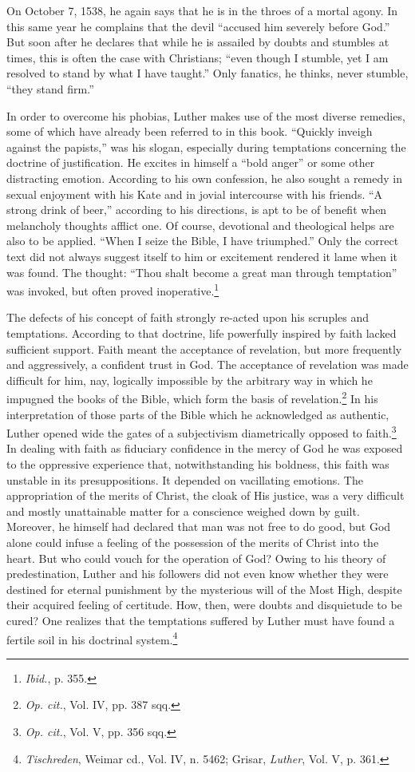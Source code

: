 On October 7, 1538, he again says that he is in the throes of a
mortal agony. In this same year he complains that the devil “accused
him severely before God.” But soon after he declares that while he is
assailed by doubts and stumbles at times, this is often the case with
Christians; “even though I stumble, yet I am resolved to stand by
what I have taught.” Only fanatics, he thinks, never stumble, “they
stand firm.”

In order to overcome his phobias, Luther makes use of the most
diverse remedies, some of which have already been referred to in
this book. “Quickly inveigh against the papists,” was his slogan,
especially during temptations concerning the doctrine of justification.
He excites in himself a “bold anger” or some other distracting
emotion. According to his own confession, he also sought a remedy in
sexual enjoyment with his Kate and in jovial intercourse with his
friends. “A strong drink of beer,” according to his directions, is apt
to be of benefit when melancholy thoughts afflict one. Of course,
devotional and theological helps are also to be applied. “When I seize
the Bible, I have triumphed.” Only the correct text did not always
suggest itself to him or excitement rendered it lame when it was
found. The thought: “Thou shalt become a great man through temptation”
was invoked, but often proved inoperative.\footnote{\textit{Ibid.}, p. 355.}

The defects of his concept of faith strongly re-acted upon his
scruples and temptations. According to that doctrine, life powerfully
inspired by faith lacked sufficient support. Faith meant the acceptance
of revelation, but more frequently and aggressively, a confident trust
in God. The acceptance of revelation was made difficult for him, nay,
logically impossible by the arbitrary way in which he impugned the
books of the Bible, which form the basis of revelation.\footnote
{\textit{Op. cit.}, Vol. IV, pp. 387 sqq.}
In his interpretation
of those parts of the Bible which he acknowledged as
authentic, Luther opened wide the gates of a subjectivism diametrically
opposed to faith.\footnote{\textit{Op. cit.}, Vol. V, pp. 356 sqq.}
In dealing with faith as fiduciary confidence
in the mercy of God he was exposed to the oppressive experience that,
notwithstanding his boldness, this faith was unstable in its presuppositions.
It depended on vacillating emotions. The appropriation of
the merits of Christ, the cloak of His justice, was a very difficult and
mostly unattainable matter for a conscience weighed down by guilt.
Moreover, he himself had declared that man was not free to do good,
but God alone could infuse a feeling of the possession of the merits
of Christ into the heart. But who could vouch for the operation
of God? Owing to his theory of predestination, Luther and his followers
did not even know whether they were destined for eternal
punishment by the mysterious will of the Most High, despite their
acquired feeling of certitude. How, then, were doubts and disquietude
to be cured? One realizes that the temptations suffered by Luther
must have found a fertile soil in his doctrinal system.\footnote{\textit{Tischreden}, Weimar cd., Vol. IV, n. 5462; Grisar, \textit{Luther}, Vol. V, p. 361.}


